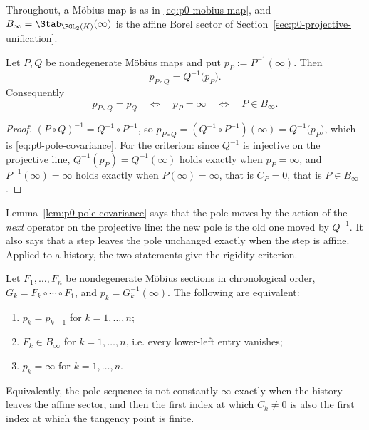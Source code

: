 Throughout, a M\"obius map is as in \eqref{eq:p0-mobius-map}, and
$B_\infty=\Stab_{\PGL_2(K)}(\infty)$ is the affine Borel sector of
Section~\ref{sec:p0-projective-unification}.

\begin{lemma}
\label{lem:p0-pole-covariance}
Let $P,Q$ be nondegenerate M\"obius maps and put $p_P:=P^{-1}(\infty)$.  Then
\begin{equation}\label{eq:p0-pole-covariance}
  p_{P\circ Q}=Q^{-1}\bigl(p_P\bigr).
\end{equation}
Consequently
\begin{equation}\label{eq:p0-pole-constancy-criterion}
  p_{P\circ Q}=p_Q
  \quad\Longleftrightarrow\quad
  p_P=\infty
  \quad\Longleftrightarrow\quad
  P\in B_\infty .
\end{equation}
\end{lemma}

\begin{proof}
$(P\circ Q)^{-1}=Q^{-1}\circ P^{-1}$, so
$p_{P\circ Q}=(Q^{-1}\circ P^{-1})(\infty)=Q^{-1}\bigl(p_P\bigr)$, which is
\eqref{eq:p0-pole-covariance}.  For the criterion: since $Q^{-1}$ is injective
on the projective line, $Q^{-1}(p_P)=Q^{-1}(\infty)$ holds exactly when
$p_P=\infty$, and $P^{-1}(\infty)=\infty$ holds exactly when
$P(\infty)=\infty$, that is $C_P=0$, that is $P\in B_\infty$.
\end{proof}

Lemma~\ref{lem:p0-pole-covariance} says that the pole moves by the action of the
\emph{next} operator on the projective line: the new pole is the old one moved by
$Q^{-1}$.  It also says that a step leaves the pole unchanged exactly when the
step is affine.  Applied to a history, the two statements give the rigidity
criterion.

\begin{proposition}
\label{prop:p0-pole-rigidity}
Let $F_1,\dots,F_n$ be nondegenerate M\"obius sections in chronological order,
$G_k=F_k\circ\cdots\circ F_1$, and $p_k=G_k^{-1}(\infty)$.  The following are
equivalent:
\begin{enumerate}
  \item $p_k=p_{k-1}$ for $k=1,\dots,n$;
  \item $F_k\in B_\infty$ for $k=1,\dots,n$, i.e. every lower-left entry
  vanishes;
  \item $p_k=\infty$ for $k=1,\dots,n$.
\end{enumerate}
Equivalently, the pole sequence is not constantly $\infty$ exactly when the
history leaves the affine sector, and then the first index at which $C_k\ne0$ is
also the first index at which the tangency point is finite.
\end{proposition}

